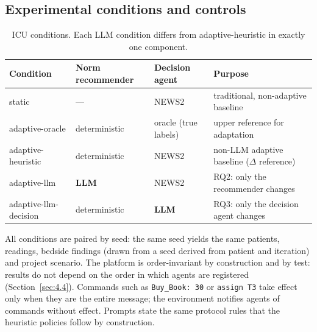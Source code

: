 \documentclass{ieeeaccess}
\begin{document}
\subsection{Experimental conditions and controls}\label{sec:3.5}
\begin{table}[!t]
\centering
\caption{ICU conditions. Each LLM condition differs from adaptive-heuristic in exactly one component.}
\label{tab:2}
\footnotesize
\setlength{\tabcolsep}{0.06cm}
\renewcommand{\arraystretch}{1.15}
\begin{tabular}{@{}>{\raggedright\arraybackslash}p{}>{\raggedright\arraybackslash}p{}>{\raggedright\arraybackslash}p{}>{\raggedright\arraybackslash}p{}@{}}
\hline
\textbf{Condition} & \textbf{Norm recommender} & \textbf{Decision agent} & \textbf{Purpose} \\ \hline
static & — & NEWS2 & traditional, non-adaptive baseline \\
adaptive-oracle & deterministic & oracle (true labels) & upper reference for adaptation \\
adaptive-heuristic & deterministic & NEWS2 & non-LLM adaptive baseline ($\Delta$ reference) \\
adaptive-llm & \textbf{LLM} & NEWS2 & RQ2: only the recommender changes \\
adaptive-llm-decision & deterministic & \textbf{LLM} & RQ3: only the decision agent changes \\ \hline
\end{tabular}
\end{table}

All conditions are paired by seed: the same seed yields the same patients, readings, bedside findings (drawn from a seed derived from patient and iteration) and project scenario. The platform is order-invariant by construction and by test: results do not depend on the order in which agents are registered (Section~\ref{sec:4.4}). Commands such as \texttt{Buy\_Book: 30} or \texttt{assign T3} take effect only when they are the entire message; the environment notifies agents of commands without effect. Prompts state the same protocol rules that the heuristic policies follow by construction.
\end{document}
